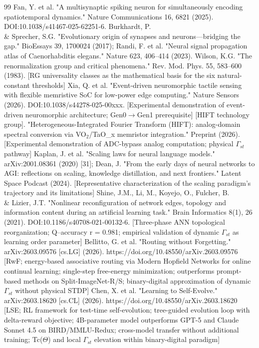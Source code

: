 \documentclass[a4paper,12pt]{article}
\begin{document}
\begin{thebibliography}{99}
 Fan, Y. et al. "A multisynaptic spiking neuron for simultaneously encoding spatiotemporal dynamics." Nature Communications 16, 6821 (2025). DOI:10.1038/s41467-025-62251-6.
 Burkhardt, P. \\& Sprecher, S.G. "Evolutionary origin of synapses and neurons---bridging the gap." BioEssays 39, 1700024 (2017); Randi, F. et al. "Neural signal propagation atlas of Caenorhabditis elegans." Nature 623, 406--414 (2023).
 Wilson, K.G. "The renormalization group and critical phenomena." Rev. Mod. Phys. 55, 583--600 (1983). [RG universality classes as the mathematical basis for the six natural-constant thresholds]
 Xia, Q. et al. "Event-driven neuromorphic tactile sensing with flexible memristive SoC for low-power edge computing." Nature Sensors (2026). DOI:10.1038/s44278-025-00xxx. [Experimental demonstration of event-driven neuromorphic architecture; Gen0$\rightarrow$Gen1 prerequisite]
 [HIFT technology group]. "Heterogeneous-Integrated Fourier Transform (HIFT): analog-domain spectral conversion via VO$_2$/TaO_{x} memristor integration." Preprint (2026). [Experimental demonstration of ADC-bypass analog computation; physical $\Gamma_{st}$ pathway]
 Kaplan, J. et al. "Scaling laws for neural language models." arXiv:2001.08361 (2020) [31]; Dean, J. "From the early days of neural networks to AGI: reflections on scaling, knowledge distillation, and next frontiers." Latent Space Podcast (2024). [Representative characterization of the scaling paradigm's trajectory and its limitations]
 Shine, J.M., Li, M., Koyejo, O., Fulcher, B. \\& Lizier, J.T. "Nonlinear reconfiguration of network edges, topology and information content during an artificial learning task." Brain Informatics 8(1), 26 (2021). DOI:10.1186/s40708-021-00132-6. [Three-phase ANN topological reorganization; Q--accuracy r = 0.981; empirical validation of dynamic $\Gamma_{st}$ as learning order parameter]
 Bellitto, G. et al. "Routing without Forgetting." arXiv:2603.09576 [cs.LG] (2026). https://doi.org/10.48550/arXiv.2603.09576 [RwF; energy-based associative routing via Modern Hopfield Networks for online continual learning; single-step free-energy minimization; outperforms prompt-based methods on Split-ImageNet-R/S; binary-digital approximation of dynamic $\Gamma_{st}$ without physical STDP]
 Chen, X. et al. "Learning to Self-Evolve." arXiv:2603.18620 [cs.CL] (2026). https://doi.org/10.48550/arXiv.2603.18620 [LSE; RL framework for test-time self-evolution; tree-guided evolution loop with delta-reward objective; 4B-parameter model outperforms GPT-5 and Claude Sonnet 4.5 on BIRD/MMLU-Redux; cross-model transfer without additional training; Tc($\Theta$) and local $\Gamma_{st}$ elevation within binary-digital paradigm]

\end{thebibliography}
\end{document}
